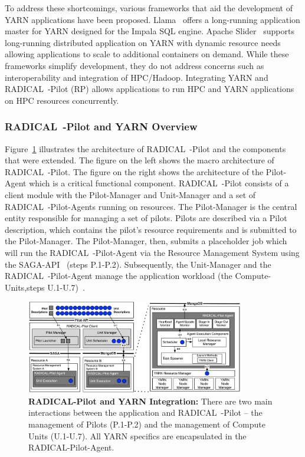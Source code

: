 To address these shortcomings, various frameworks that aid the development of YARN applications have been proposed.
Llama~\cite{llama} offers a long-running application master for YARN designed for the Impala SQL engine.
Apache Slider~\cite{apache-slider} supports long-running distributed application on YARN with dynamic resource needs allowing applications to scale to additional containers on demand.
While these frameworks simplify development, they do not address concerns such as interoperability and integration of HPC/Hadoop.
Integrating YARN and RADICAL~-Pilot (RP) allows applications to run HPC and YARN applications on HPC resources concurrently.

\subsubsection*{RADICAL~-Pilot and YARN Overview}
\label{sssec:rp_yarn}
Figure~\ref{fig:comp_rp_arch} illustrates the architecture of RADICAL~-Pilot and the components that were extended.
The figure on the left shows the macro architecture of RADICAL~-Pilot.
The figure on the right shows the architecture of the Pilot-Agent which is a critical functional component.
RADICAL~-Pilot consists of a client module with the Pilot-Manager and Unit-Manager and a set of RADICAL~-Pilot-Agents running on resources.
The Pilot-Manager is the central entity responsible for managing a set of pilots.
Pilots are described via a Pilot description, which contains the pilot's resource requirements and is submitted to the Pilot-Manager.
The Pilot-Manager, then, submits a placeholder job which will run the RADICAL~-Pilot-Agent via the Resource Management System using the SAGA-API~\cite{merzky2015saga} (steps P.1-P.2).
Subsequently, the Unit-Manager and the RADICAL~-Pilot-Agent manage the application workload (the Compute-Units,steps U.1-U.7)~\cite{merzky2019using}.

\begin{figure}
    \centering
    \includegraphics[width=0.85\textwidth]{figures/data_analytics_hpc/hpc_hadoop/rp-architecture-yarn.pdf}
    \caption{\textbf{RADICAL-Pilot and YARN Integration:} There are two main interactions between the application and RADICAL~-Pilot -- the management of Pilots (P.1-P.2) and the management of Compute Units (U.1-U.7).  All YARN specifics are encapsulated in the RADICAL-Pilot-Agent.\label{fig:comp_rp_arch}}
\end{figure}

